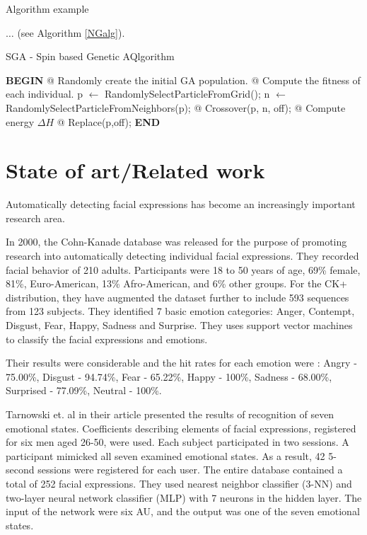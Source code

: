 \documentclass[runningheads,a4paper,11pt]{report}
\begin{document}
Algorithm example 

$\ldots$ (see Algorithm \ref{NGalg}).



\begin{algorithm}
	\caption{SGA - Spin based Genetic AQlgorithm}
	\label{NGalg}
		\begin{algorithmic}


			\STATE \textbf{BEGIN}
  		\STATE @ Randomly create the initial GA population.
  		\STATE @ Compute the fitness of each individual.
  				\STATE p $\leftarrow$ RandomlySelectParticleFromGrid();
  				\STATE n $\leftarrow$ RandomlySelectParticleFromNeighbors(p);
  				\STATE @ Crossover(p, n, off);
  				\STATE @ Compute energy $\Delta H$
  					\STATE @ Replace(p,off);
  				\ENDIF
  			\ENDFOR
  		\ENDFOR
  		\STATE \textbf{END}
\end{algorithmic}
\end{algorithm}


\chapter{State of art/Related work}
\label{chapter:stateOfArt}

Automatically detecting facial expressions has become an increasingly important research area.

In 2000, the Cohn-Kanade database was released for the purpose of promoting research into automatically detecting individual facial expressions. \cite{Lucey10}
They recorded facial behavior of 210 adults. Participants were 18 to 50 years of age, 69\% female, 81\%, Euro-American, 13\% Afro-American, and 6\% other groups. For the CK+ distribution, they have augmented the dataset further to include 593 sequences from 123 subjects.
They identified 7 basic emotion categories: Anger, Contempt, Disgust, Fear, Happy, Sadness and Surprise.
They uses support vector machines to classify the facial expressions and emotions.

Their results were considerable and the hit rates for each emotion were : Angry - 75.00\%, Disgust - 94.74\%, Fear - 65.22\%, Happy - 100\%, Sadness - 68.00\%, Surprised - 77.09\%, Neutral - 100\%. \cite{Lucey10}


Tarnowski et. al in their article presented the results of recognition of seven emotional states. Coefficients describing elements of facial expressions, registered for six men aged 26-50, were used.
Each subject participated in two sessions. A participant mimicked all seven examined emotional states. As a result, 42 5-second sessions were registered for each user. The entire database contained a total of 252 facial expressions. \cite{Tarnowski17}
They used nearest neighbor classifier (3-NN) and two-layer neural network classifier (MLP) with 7 neurons in the hidden layer.
The input of the network were six AU, and the output was one of the seven emotional states.
\end{document}
